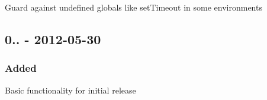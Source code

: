 \begin{DoxyItemize}
\item Guard against undefined globals like {\ttfamily set\+Timeout} in some environments
\end{DoxyItemize}

\subsection*{0.. -\/ 2012-\/05-\/30}

\subsubsection*{Added}


\begin{DoxyItemize}
\item Basic functionality for initial release 
\end{DoxyItemize}